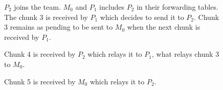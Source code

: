 \begin{figure}
   \caption{$P_2$ joins the team. $M_0$
    and $P_1$ includes $P_2$ in their forwarding tables. The chunk 3
    is received by $P_1$ which decides to send it to $P_2$. Chunk 3
    remains as pending to be sent to $M_0$ when the next chunk is
    received by $P_1$. \label{fig:team_2}}
\end{figure}
    
\begin{figure}
   \caption{Chunk 4 is received by $P_2$ which
    relays it to $P_1$, what relays chunk 3 to
    $M_0$.\label{fig:team_3}}
\end{figure}

\begin{figure}
   \caption{Chunk 5 is received by $M_0$ which
    relays it to $P_2$.\label{fig:team_4}}
\end{figure}

\begin{notex}
  \begin{figure*}
  \end{figure*}
  
  \begin{figure*}
  \end{figure*}
  
  \begin{figure*}
  \end{figure*}
  
  \begin{figure*}
  \end{figure*}
  
  \begin{figure*}
  \end{figure*}
  
  \begin{figure*}
  \end{figure*}
  
  \begin{figure*}
  \end{figure*}
  
  \begin{figure*}
  \end{figure*}
  
  \begin{figure*}
  \end{figure*}

\end{notex}

